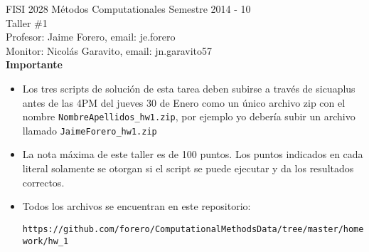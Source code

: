 \documentclass{article}
\begin{document}
\noindent
FISI 2028 M\'etodos Computationales
Semestre 2014 - 10\\
Taller \#1\\
Profesor: Jaime Forero, email: je.forero\\
Monitor: Nicol\'as Garavito, email: jn.garavito57\\

{\bf Importante}
\begin{itemize}

\item Los tres scripts de soluci\'on de esta tarea deben subirse a
  trav\'es de sicuaplus antes de las 4PM del jueves 30 de Enero como
  un \'unico archivo zip con el nombre
  \verb"NombreApellidos_hw1.zip", por ejemplo yo deber\'ia subir un
  archivo llamado \verb"JaimeForero_hw1.zip"

\item La nota m\'axima de este taller es de 100 puntos. Los puntos indicados
en cada literal solamente se otorgan si el script se puede ejecutar y
da los resultados correctos.  

\item Todos los archivos se encuentran en este repositorio:

  \verb"https://github.com/forero/ComputationalMethodsData/tree/master/homework/hw_1"
\end{itemize}
\end{document}
